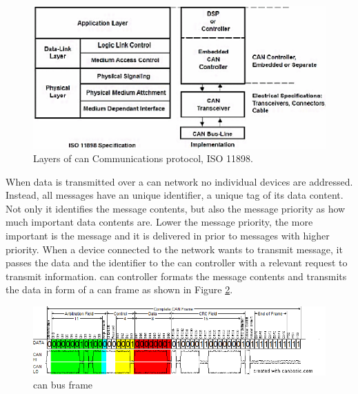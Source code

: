 \begin{figure}[H]
\begin{center}
\captionsetup{font=small}
\includegraphics[scale=0.5]{pics/iso_osi_can.png}
\caption{Layers of \gls{can} Communications protocol, ISO 11898\cite{5116731}.}
\label{fig:iso_osi_can}
\end{center}
\end{figure}
When data is transmitted over a \gls{can} network no individual devices are addressed. Instead, all messages have an unique identifier, a unique tag of its data content. Not only it identifies the message contents, but also the message priority as how much important data contents are. Lower the message priority, the more important is the message and it is delivered in prior to messages with higher priority. When a device connected to the network wants to transmit message, it passes the data and the identifier to the \gls{can} controller with a relevant request to transmit information. \gls{can} controller formats the message contents and transmits the data in form of a \gls{can} frame as shown in Figure \ref{fig:can_bus_frame}.
\begin{figure}[H]
\begin{center}
\captionsetup{font=small}
\includegraphics[scale=0.55]{pics/can_bus_frame.png}
\caption{\gls{can} bus frame \cite{can_frame_pic}}
\label{fig:can_bus_frame}
\end{center}
\end{figure}
